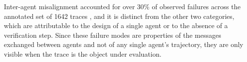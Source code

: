 Inter-agent misalignment accounted for over 30\% of observed failures across the annotated set of 1642 traces \cite{cemriWhyMultiAgentLLM2025a}, and it is distinct from the other two categories, which are attributable to the design of a single agent or to the absence of a verification step. Since these failure modes are properties of the messages exchanged between agents and not of any single agent's trajectory, they are only visible when the trace is the object under evaluation.
